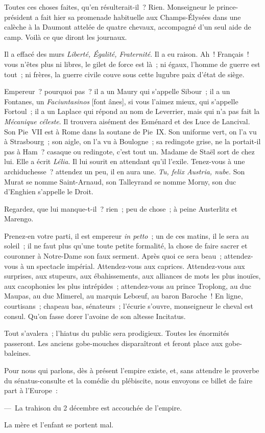 \documentclass[french,twoside]{book} %
\begin{document}
Toutes ces choses faites, qu’en résulterait-il ? Rien. Monseigneur le prince-président a fait hier sa promenade habituelle aux Champs-Élysées dans une calèche à la Daumont attelée de quatre chevaux, accompagné d’un seul aide de camp. Voilà ce que diront les journaux.\par
Il a effacé des murs \emph{Liberté, Égalité, Fraternité}. Il a eu raison. Ah ! Français ! vous n’êtes plus ni libres, le gilet de force est là ; ni égaux, l’homme de guerre est tout ; ni frères, la guerre civile couve sous cette lugubre paix d’état de siège.\par
Empereur ? pourquoi pas ? il a un Maury qui s’appelle Sibour ; il a un Fontanes, un \emph{Faciuntasinos} [font ânes], si vous l’aimez mieux, qui s’appelle Fortoul ; il a un Laplace qui répond au nom de Leverrier, mais qui n’a pas fait la \emph{Mécanique céleste}. Il trouvera aisément des Esménard et des Luce de Lancival. Son Pie VII est à Rome dans la soutane de Pie IX. Son uniforme vert, on l’a vu à Strasbourg ; son aigle, on l’a vu à Boulogne ; sa redingote grise, ne la portait-il pas à Ham ? casaque ou redingote, c’est tout un. Madame de Staël sort de chez lui. Elle a écrit \emph{Lélia}. Il lui sourit en attendant qu’il l’exile. Tenez-vous à une archiduchesse ? attendez un peu, il en aura une. \emph{Tu, felix Austria, nube.} Son Murat se nomme Saint-Arnaud, son Talleyrand se nomme Morny, son duc d’Enghien s’appelle le Droit.\par
Regardez, que lui manque-t-il ? rien ; peu de chose ; à peine Austerlitz et Marengo.\par
Prenez-en votre parti, il est empereur \emph{in petto} ; un de ces matins, il le sera au soleil ; il ne faut plus qu’une toute petite formalité, la chose de faire sacrer et couronner à Notre-Dame son faux serment. Après quoi ce sera beau ; attendez-vous à un spectacle impérial. Attendez-vous aux caprices. Attendez-vous aux surprises, aux stupeurs, aux ébahissements, aux alliances de mots les plus inouïes, aux cacophonies les plus intrépides ; attendez-vous au prince Troplong, au duc Maupas, au duc Mimerel, au marquis Lebœuf, au baron Baroche ! En ligne, courtisans ; chapeau bas, sénateurs ; l’écurie s’ouvre, monseigneur le cheval est consul. Qu’on fasse dorer l’avoine de son altesse Incitatus.\par
Tout s’avalera ; l’hiatus du public sera prodigieux. Toutes les énormités passeront. Les anciens gobe-mouches disparaîtront et feront place aux gobe-baleines.\par
Pour nous qui parlons, dès à présent l’empire existe, et, sans attendre le proverbe du sénatus-consulte et la comédie du plébiscite, nous envoyons ce billet de faire part à l’Europe :\par
— La trahison du 2 décembre est accouchée de l’empire.\par
La mère et l’enfant se portent mal.
\end{document}
